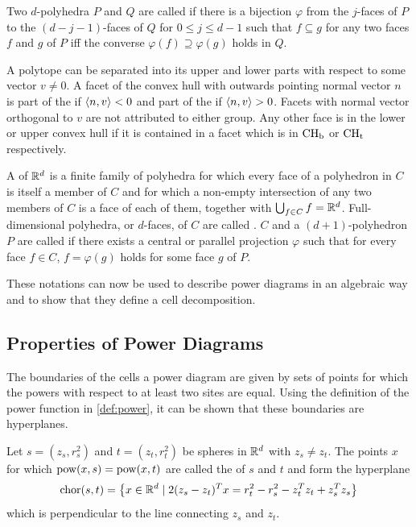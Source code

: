 Two $d$-polyhedra $P$ and $Q$ are called  if there is a bijection $\varphi$ from the $j$-faces of $P$ to the $(d-j-1)$-faces of $Q$ for $0 \leq j \leq d  -1$ such that $f \subseteq g$ for any two faces $f$ and $g$ of $P$ iff the converse $\varphi(f) \supseteq \varphi(g)$ holds in $Q$.

A polytope can be separated into its upper and lower parts with respect to some vector $v \neq 0$.
A facet of the convex hull with outwards pointing normal vector $n$ is part of the  if $\left\langle n, v \right\rangle < 0$ and part of the  if $\left\langle n, v \right\rangle > 0$.
Facets with normal vector orthogonal to $v$ are not attributed to either group.
Any other face is in the lower or upper convex hull if it is contained in a facet which is in $\operatorname{CH_b}$ or $\operatorname{CH_t}$ respectively.

A  of $\mathbb{R}^d$ is a finite family of polyhedra for which every face of a polyhedron in $C$ is itself a member of $C$ and for which a non-empty intersection of any two members of $C$ is a face of each of them, together with $\bigcup_{f \in C} f = \mathbb{R}^d$.
Full-dimensional polyhedra, or $d$-faces, of $C$ are called .
$C$ and a $(d+1)$-polyhedron $P$ are called  if there exists a central or parallel projection $\varphi$ such that for every face $f \in C$, $f = \varphi(g)$ holds for some face $g$ of $P$.

These notations can now be used to describe power diagrams in an algebraic way and to show that they define a cell decomposition.

\subsection{Properties of Power Diagrams}
\label{sub:properties_of_power_diagrams}
The boundaries of the cells a power diagram are given by sets of points for which the powers with respect to at least two sites are equal.
Using the definition of the power function in \cref{def:power}, it can be shown that these boundaries are hyperplanes.
\begin{lemma}
    \label{lem:chordale}
    Let $s = (z_s, r^2_s)$ and $t = (z_t, r^2_t)$ be spheres in $\mathbb{R}^d$ with $z_s \neq z_t$. The points $x$ for which $\operatorname{pow}(x, s) = \operatorname{pow}(x, t)$ are called the  of $s$ and $t$ and form the hyperplane
    \begin{align}
        \operatorname{chor}(s, t) = \left\{ x \in \mathbb{R}^d \mid 2(z_s - z_t)^Tx = r_t^2 - r_s^2 - z_t^Tz_t + z_s^Tz_s \right\}
    \end{align}
    which is perpendicular to the line connecting $z_s$ and $z_t$.
\end{lemma}


